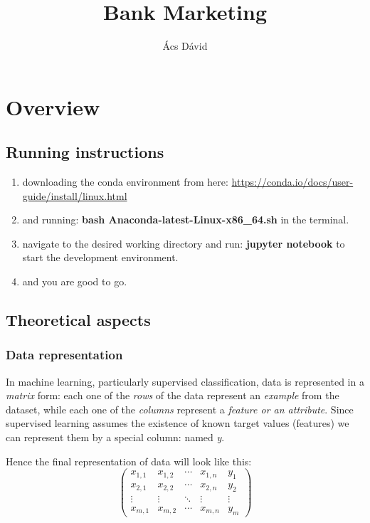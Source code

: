 \documentclass[a4paper,10pt]{article}
\title{Bank Marketing}
\author{\'Acs D\'avid}
\begin{document}
\maketitle


\tableofcontents
\section{Overview}
 
 \subsection{Running instructions}

\begin{enumerate}
\item downloading the conda environment from here: 
\url {https://conda.io/docs/user-guide/install/linux.html}
\item and running: \textbf{bash Anaconda-latest-Linux-x86\_64.sh} in the terminal.
\item navigate to the desired working directory and run: 
	\textbf{jupyter notebook} to start the development environment. 
\item and you are good to go.

\end{enumerate}
 
 \subsection{Theoretical aspects}
  \subsubsection{Data representation}
  
  In machine learning, particularly supervised classification, 
  data is represented in a \textit{matrix} form: each one of the \textit{rows} 
  of the data represent an \textit{example} from the dataset, while each one of the \textit{columns} 
  represent a \textit{feature or an attribute}. Since supervised learning assumes the existence of 
  known target values (features) we can represent them by a special column: named \textit{y}.
  
  Hence the final representation of data will look like this:
  \[
  \begin{pmatrix}
  x_{1, 1} & x_{1, 2} & \cdots & x_{1, n} & y_{1} \\
  x_{2, 1} & x_{2, 2} & \cdots & x_{2, n} & y_{2} \\
  \vdots & \vdots & \ddots & \vdots & \vdots \\
  x_{m, 1} & x_{m, 2} & \cdots & x_{m, n} & y_{m}
  \end{pmatrix}
  \]
  
\end{document}
